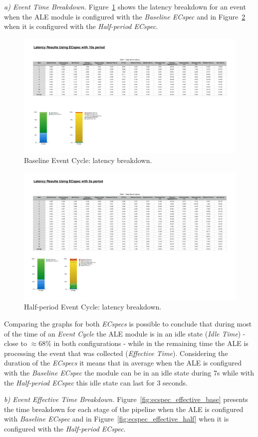 \textit{a) Event Time Breakdown.}
Figure~\ref{fig:ecspec_base} shows the latency breakdown for an event when the \gls{ALE} module is
configured with the \textit{Baseline ECspec} and in Figure~\ref{fig:ecspec_half} when it is configured
with the \textit{Half-period ECspec}.

\begin{figure}[ht!]
 \centering
 \includegraphics[width=.55\linewidth]{./figures/edge_ecspec_breakdown}
 \caption{Baseline Event Cycle: latency breakdown.}
 \label{fig:ecspec_base}
\end{figure}

\begin{figure}[ht!]
 \centering
 \includegraphics[width=.55\linewidth]{./figures/edge_ecspecf_breakdown}
 \caption{Half-period Event Cycle: latency breakdown.}
 \label{fig:ecspec_half}
\end{figure}

Comparing the graphs for both \textit{ECspecs} is possible to conclude that during most of the time of
an \textit{Event Cycle} the \gls{ALE} module is in an idle state (\textit{Idle Time}) - close to $\approx68\%$
in both configurations - while in the remaining time the \gls{ALE} is processing the event that was
collected (\textit{Effective Time}). Considering the duration of the \textit{ECspecs} it means that in
average when the \gls{ALE} is configured with the \textit{Baseline ECspec} the module can be in an idle
state during 7s while with the \textit{Half-period ECspec} this idle state can last for 3 seconds.

\textit{b) Event Effective Time Breakdown.}
Figure~\ref{fig:ecspec_effective_base} presents the time breakdown for each stage of the pipeline
when the \gls{ALE} is configured with \textit{Baseline ECspec} and in Figure~\ref{fig:ecspec_effective_half}
when it is configured with the \textit{Half-period ECspec}.

